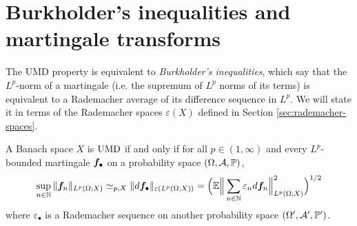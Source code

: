 \section{Burkholder's inequalities and martingale transforms}

The UMD property is equivalent to \emph{Burkholder's inequalities}, which say that the $L^p$-norm of a martingale (i.e. the supremum of $L^p$ norms of its terms) is equivalent to a Rademacher average of its difference sequence in $L^p$.
We will state it in terms of the Rademacher spaces $\varepsilon(X)$ defined in Section \ref{sec:rademacher-spaces}.

\begin{thm}\label{thm:burkholder}
  A Banach space $X$ is $\mathrm{UMD}$ if and only if for all $p \in (1,\infty)$ and every $L^p$-bounded martingale $\bm{f}_{\bullet}$ on a probability space $(\Omega,\mathcal{A},\mathbb{P})$,
  \begin{equation}\label{eq:burkholder}
    \sup_{n \in \mathbb{N}} \|\bm{f}_{n}\|_{L^p(\Omega;X)} \simeq_{p,X} \|d\bm{f}_{\bullet}\|_{\varepsilon(L^p(\Omega;X))} = \Big( \mathbb{E} \Big\| \sum_{n \in \mathbb{N}} \varepsilon_{n} d\bm{f}_{n} \Big\|_{L^p(\Omega;X)}^{2} \Big)^{1/2}
  \end{equation}
  where $\varepsilon_{\bullet}$ is a Rademacher sequence on another probability space $(\Omega', \mathcal{A}', \mathbb{P}')$.
\end{thm}

